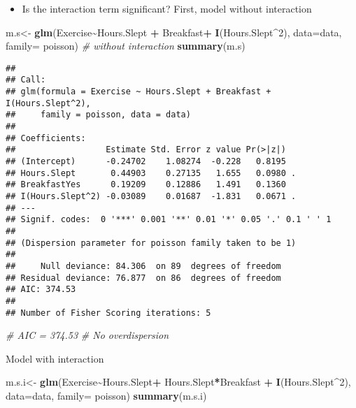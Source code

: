 \documentclass[
]{article}
\newenvironment{Shaded}{\begin{snugshade}}{\end{snugshade}}
\newcommand{\AttributeTok}[1]{\textcolor[rgb]{0.13,0.29,0.53}{#1}}
\newcommand{\CommentTok}[1]{\textcolor[rgb]{0.56,0.35,0.01}{\textit{#1}}}
\newcommand{\DecValTok}[1]{\textcolor[rgb]{0.00,0.00,0.81}{#1}}
\newcommand{\FunctionTok}[1]{\textcolor[rgb]{0.13,0.29,0.53}{\textbf{#1}}}
\newcommand{\NormalTok}[1]{#1}
\newcommand{\OtherTok}[1]{\textcolor[rgb]{0.56,0.35,0.01}{#1}}
\newcommand{\SpecialCharTok}[1]{\textcolor[rgb]{0.81,0.36,0.00}{\textbf{#1}}}
\providecommand{\tightlist}{%
  \setlength{\itemsep}{0pt}\setlength{\parskip}{0pt}}
\begin{document}
\begin{itemize}
\tightlist
\item
  Is the interaction term significant? First, model without interaction
\end{itemize}

\begin{Shaded}
\begin{Highlighting}[]
\NormalTok{m.s}\OtherTok{\textless{}{-}} \FunctionTok{glm}\NormalTok{(Exercise}\SpecialCharTok{\textasciitilde{}}\NormalTok{Hours.Slept }\SpecialCharTok{+}\NormalTok{ Breakfast}\SpecialCharTok{+} \FunctionTok{I}\NormalTok{(Hours.Slept}\SpecialCharTok{\^{}}\DecValTok{2}\NormalTok{), }\AttributeTok{data=}\NormalTok{data, }\AttributeTok{family=}\NormalTok{ poisson)}
\CommentTok{\# without interaction}
\FunctionTok{summary}\NormalTok{(m.s)}
\end{Highlighting}
\end{Shaded}

\begin{verbatim}
## 
## Call:
## glm(formula = Exercise ~ Hours.Slept + Breakfast + I(Hours.Slept^2), 
##     family = poisson, data = data)
## 
## Coefficients:
##                  Estimate Std. Error z value Pr(>|z|)  
## (Intercept)      -0.24702    1.08274  -0.228   0.8195  
## Hours.Slept       0.44903    0.27135   1.655   0.0980 .
## BreakfastYes      0.19209    0.12886   1.491   0.1360  
## I(Hours.Slept^2) -0.03089    0.01687  -1.831   0.0671 .
## ---
## Signif. codes:  0 '***' 0.001 '**' 0.01 '*' 0.05 '.' 0.1 ' ' 1
## 
## (Dispersion parameter for poisson family taken to be 1)
## 
##     Null deviance: 84.306  on 89  degrees of freedom
## Residual deviance: 76.877  on 86  degrees of freedom
## AIC: 374.53
## 
## Number of Fisher Scoring iterations: 5
\end{verbatim}

\begin{Shaded}
\begin{Highlighting}[]
\CommentTok{\# AIC = 374.53}
\CommentTok{\# No overdispersion}
\end{Highlighting}
\end{Shaded}

Model with interaction

\begin{Shaded}
\begin{Highlighting}[]
\NormalTok{m.s.i}\OtherTok{\textless{}{-}} \FunctionTok{glm}\NormalTok{(Exercise}\SpecialCharTok{\textasciitilde{}}\NormalTok{Hours.Slept}\SpecialCharTok{+}\NormalTok{ Hours.Slept}\SpecialCharTok{*}\NormalTok{Breakfast }\SpecialCharTok{+} \FunctionTok{I}\NormalTok{(Hours.Slept}\SpecialCharTok{\^{}}\DecValTok{2}\NormalTok{), }\AttributeTok{data=}\NormalTok{data, }\AttributeTok{family=}\NormalTok{ poisson)}
\FunctionTok{summary}\NormalTok{(m.s.i)}
\end{Highlighting}
\end{Shaded}
\end{document}
